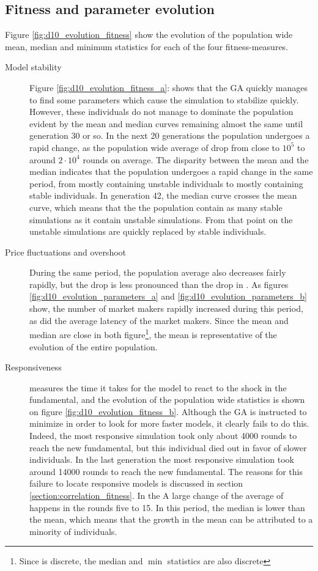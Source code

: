 \subsection{Fitness and parameter evolution}
Figure \ref{fig:d10_evolution_fitness} show the evolution of the population wide mean, median and minimum statistics for each of the four fitness-measures. 
\begin{description}
\item[Model stability]
Figure \ref{fig:d10_evolution_fitness_a}: shows that  the GA quickly manages to find some parameters which cause the simulation to stabilize quickly. However, these individuals do not manage to dominate the population evident by the mean and median curves remaining almost the same until generation 30 or so. In the next 20 generations the population undergoes a rapid change, as the population wide average of \roundstable drop from close to $10^5$ to around $2\cdot 10^4$ rounds on average. The disparity between the mean and the median indicates that the population undergoes a rapid change in the same period, from mostly containing unstable individuals to mostly containing stable individuals. In generation 42, the median curve crosses the mean curve, which means that the the population contain as many stable simulations as it contain unstable simulations. From that point on the unstable simulations are quickly replaced by stable individuals.
\item[Price fluctuations and overshoot] During the same period, the population average \stdev also decreases fairly rapidly, but the drop is less pronounced than the drop in \stdev. As figures \ref{fig:d10_evolution_parameters_a} and \ref{fig:d10_evolution_parameters_b} show, the number of market makers rapidly increased during this period, as did the average latency of the market makers. Since the mean and median are close in both figure\footnote{Since \overshoot is discrete, the median and $\min$ statistics are also discrete}, the mean is representative of the evolution of the entire population.
\item[Responsiveness] \timetoreachnewfundamental measures the time it takes for the model to react to the shock in the fundamental, and the evolution of the population wide statistics is shown on figure \ref{fig:d10_evolution_fitness_b}. Although the GA is instructed to minimize \timetoreachnewfundamental in order to look for more faster models, it clearly fails to do this. Indeed, the most responsive simulation took only about 4000 rounds to reach the new fundamental, but this individual died out in favor of slower individuals. In the last generation the most responsive simulation took around 14000 rounds to reach the new fundamental. The reasons for this failure to locate responsive models is discussed in section \ref{section:correlation_fitness}. In the A large change of the average of \timetoreachnewfundamental happens in the rounds five to 15. In this period, the median is lower than the mean, which means that the growth in the mean can be attributed to a minority of individuals.
\end{description}

